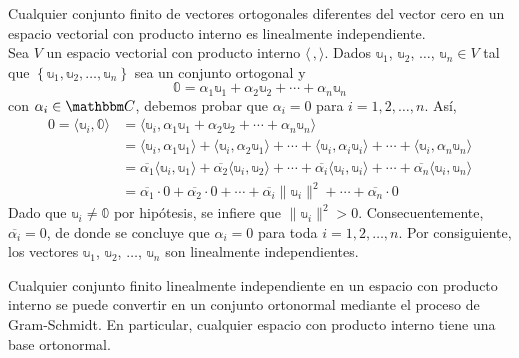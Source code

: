 \begin{theorem}
    Cualquier conjunto finito de vectores ortogonales diferentes del vector  cero en un espacio vectorial con producto interno es linealmente independiente. \\
    \demostracion Sea $V$ un espacio vectorial con producto interno $\langle \, , \rangle$. Dados $\mathbb{u}_1$, $\mathbb{u}_2$, $\dots$, $\mathbb{u}_n \in V$ tal que $\left\{ \mathbb{u}_1, \mathbb{u}_2, \dots, \mathbb{u}_n \right\}$ sea un conjunto ortogonal y
    $$\mathbb{0} = \alpha_1\mathbb{u}_1 + \alpha_2\mathbb{u}_2 + \cdots + \alpha_n\mathbb{u}_n$$
    con $\alpha_i \in \CC$, debemos probar que $\alpha_i = 0$ para $i = 1, 2, \dots, n$. Así,
    \begin{align*}
        0 = \langle \mathbb{u}_i, \mathbb{0} \rangle & = \langle \mathbb{u}_i, \alpha_1\mathbb{u}_1 + \alpha_2\mathbb{u}_2 + \cdots + \alpha_n\mathbb{u}_n \rangle \\
        & = \langle \mathbb{u}_i, \alpha_1 \mathbb{u}_1 \rangle + \langle \mathbb{u}_i, \alpha_2 \mathbb{u}_1 \rangle + \cdots + \langle \mathbb{u}_i, \alpha_i \mathbb{u}_i \rangle + \cdots + \langle \mathbb{u}_i, \alpha_n \mathbb{u}_n \rangle \\
        & = \overline{\alpha_1} \langle \mathbb{u}_i, \mathbb{u}_1 \rangle + \overline{\alpha_2} \langle \mathbb{u}_i, \mathbb{u}_2 \rangle + \cdots + \overline{\alpha_i} \langle \mathbb{u}_i, \mathbb{u}_i \rangle + \cdots + \overline{\alpha_n} \langle \mathbb{u}_i, \mathbb{u}_n \rangle \\
        & = \overline{\alpha_1} \cdot 0 + \overline{\alpha_2} \cdot 0 + \cdots + \overline{\alpha_i} \| \mathbb{u}_i \|^2 + \cdots + \overline{\alpha_n} \cdot 0
    \end{align*}
    Dado que $\mathbb{u}_i \neq \mathbb{0}$ por hipótesis, se infiere que $\| \mathbb{u}_i \|^2 > 0$. Consecuentemente, $\overline{\alpha_i} = 0$, de donde se concluye que $\alpha_i = 0$ para toda $i = 1, 2, \dots, n$. Por consiguiente, los vectores $\mathbb{u}_1$, $\mathbb{u}_2$, $\dots$, $\mathbb{u}_n$ son linealmente independientes.
\end{theorem}

\begin{theorem}
    Cualquier conjunto finito linealmente independiente en un espacio con producto interno se puede convertir en un conjunto ortonormal mediante el proceso de Gram-Schmidt. En particular, cualquier espacio con producto interno tiene una base ortonormal.
\end{theorem}

